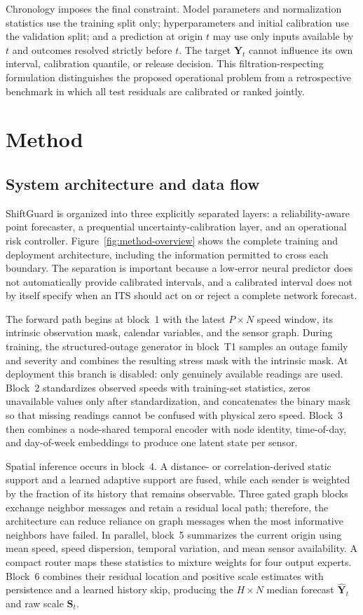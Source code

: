 \documentclass[preprint,12pt]{elsarticle}
\begin{document}
Chronology imposes the final constraint. Model parameters and normalization
statistics use the training split only; hyperparameters and initial calibration
use the validation split; and a prediction at origin $t$ may use only inputs
available by $t$ and outcomes resolved strictly before $t$. The target
$\mathbf{Y}_t$ cannot influence its own interval, calibration quantile, or
release decision. This filtration-respecting formulation distinguishes the
proposed operational problem from a retrospective benchmark in which all test
residuals are calibrated or ranked jointly.

\section{Method}
\subsection{System architecture and data flow}
ShiftGuard is organized into three explicitly separated layers: a
reliability-aware point forecaster, a prequential uncertainty-calibration
layer, and an operational risk controller. Figure~\ref{fig:method-overview}
shows the complete training and deployment architecture, including the
information permitted to cross each boundary. The separation is important
because a low-error neural predictor does not automatically provide calibrated
intervals, and a calibrated interval does not by itself specify when an ITS
should act on or reject a complete network forecast.

The forward path begins at block~1 with the latest $P\times N$ speed window,
its intrinsic observation mask, calendar variables, and the sensor graph.
During training, the structured-outage generator in block~T1 samples an outage
family and severity and combines the resulting stress mask with the intrinsic
mask. At deployment this branch is disabled: only genuinely available readings
are used. Block~2 standardizes observed speeds with training-set statistics,
zeros unavailable values only after standardization, and concatenates the
binary mask so that missing readings cannot be confused with physical zero
speed. Block~3 then combines a node-shared temporal encoder with node identity,
time-of-day, and day-of-week embeddings to produce one latent state per sensor.

Spatial inference occurs in block~4. A distance- or correlation-derived static
support and a learned adaptive support are fused, while each sender is weighted
by the fraction of its history that remains observable. Three gated graph
blocks exchange neighbor messages and retain a residual local path; therefore,
the architecture can reduce reliance on graph messages when the most
informative neighbors have failed. In parallel, block~5 summarizes the current
origin using mean speed, speed dispersion, temporal variation, and mean sensor
availability. A compact router maps these statistics to mixture weights for
four output experts. Block~6 combines their residual location and positive
scale estimates with persistence and a learned history skip, producing the
$H\times N$ median forecast $\widehat{\mathbf{Y}}_t$ and raw scale
$\mathbf{S}_t$.
\end{document}
